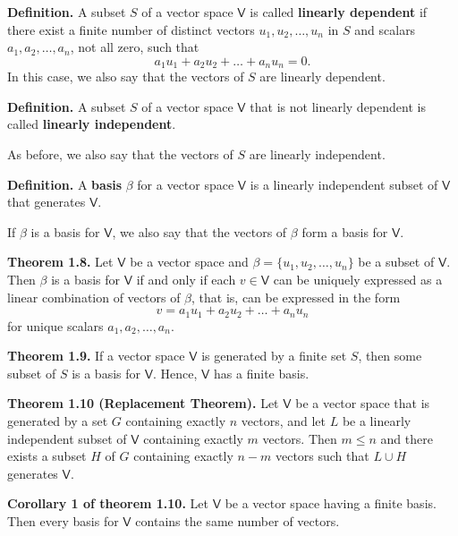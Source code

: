 \documentclass{article}
\newcommand{\0}{\mathit{0}}
\begin{document}
\medskip

\textbf{Definition.}
A subset $S$ of a vector space $\mathsf{V}$ is called \textbf{linearly
    dependent} if there exist a finite number of distinct vectors
$u_1, u_2, \dots, u_n$ in $S$ and scalars $a_1, a_2, \dots, a_n$,
not all zero, such that
\[
    a_1 u_1 + a_2 u_2 + \dots + a_n u_n = \0.
\]
In this case, we also say that the vectors of $S$ are linearly dependent.

\medskip

\textbf{Definition.}
A subset $S$ of a vector space $\mathsf{V}$ that is not linearly
dependent is called \textbf{linearly independent}.

As before, we also say that the vectors of $S$ are linearly independent.

\medskip

\textbf{Definition.}
A \textbf{basis} $\beta$ for a vector space $\mathsf{V}$ is a linearly independent
subset of $\mathsf{V}$ that generates $\mathsf{V}$.

If $\beta$ is a basis for $\mathsf{V}$, we also say that the vectors of
$\beta$ form a basis for $\mathsf{V}$.

\medskip

\textbf{Theorem 1.8.} Let $\mathsf{V}$ be a vector space and
$\beta = \{ u_1, u_2, \dots, u_n \}$ be a subset of $\mathsf{V}$.
Then $\beta$ is a basis for $\mathsf{V}$ if and only if each
$v \in \mathsf{V}$ can be uniquely expressed as a linear
combination of vectors of $\beta$, that is, can be expressed in the form
\[
    v = a_1 u_1 + a_2 u_2 + \dots + a_n u_n
\]
for unique scalars $a_1, a_2, \dots, a_n$.

\medskip

\textbf{Theorem 1.9.} If a vector space $\mathsf{V}$ is generated by a finite
set $S$, then some subset of $S$ is a basis for $\mathsf{V}$.
Hence, $\mathsf{V}$ has a finite basis.

\medskip

\textbf{Theorem 1.10 (Replacement Theorem).}
Let $\mathsf{V}$ be a vector space that is generated by a set $G$ containing
exactly $n$ vectors, and let $L$ be a linearly independent subset of
$\mathsf{V}$ containing exactly $m$ vectors. Then $m \leq n$ and there
exists a subset $H$ of $G$ containing exactly $n - m$ vectors such that
$L \cup H$ generates $\mathsf{V}$.

\medskip

\textbf{Corollary 1 of theorem 1.10.} Let $\mathsf{V}$ be a vector space having a finite basis.
Then every basis for $\mathsf{V}$ contains the same number of vectors.
\end{document}
